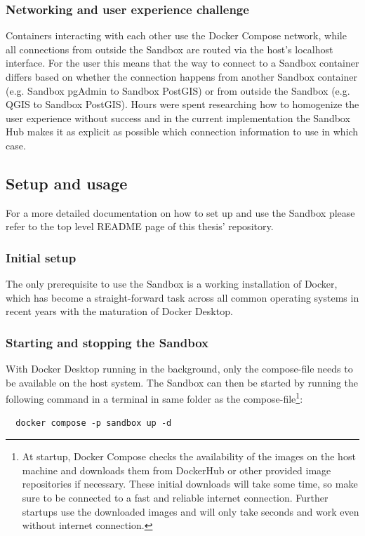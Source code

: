 \documentclass[11pt, a4paper, oneside, parskip=full-]{scrartcl}
\begin{document}
\subsubsection*{Networking and user experience challenge}
Containers interacting with each other use the Docker Compose network, while all
connections from outside the Sandbox are routed via the host's localhost
interface. For the user this means that the way to connect to a Sandbox
container differs based on whether the connection happens from another Sandbox
container (e.g. Sandbox pgAdmin to Sandbox PostGIS) or from outside the Sandbox
(e.g. QGIS to Sandbox PostGIS). Hours were spent researching how to homogenize
the user experience without success and in the current implementation the
Sandbox Hub makes it as explicit as possible which connection information to use
in which case.


\subsection{Setup and usage}
For a more detailed documentation on how to set up and use the Sandbox please
refer to the top level README page of this thesis'
repository\cite{osgissandbox}.

\subsubsection*{Initial setup}
The only prerequisite to use the Sandbox is a working installation of Docker,
which has become a straight-forward task across all common operating systems in
recent years with the maturation of Docker Desktop\cite{dockerdesktop}.

\subsubsection*{Starting and stopping the Sandbox}
With Docker Desktop running in the background, only the
compose-file\cite{sandboxcomposefile} needs to be available on the host system.
The Sandbox can then be started by running the following command in a terminal
in same folder as the compose-file\footnote{At startup, Docker Compose checks
the availability of the images on the host machine and downloads them from
DockerHub or other provided image repositories if necessary. These initial
downloads will take some time, so make sure to be connected to a fast and
reliable internet connection. Further startups use the downloaded images and
will only take seconds and work even without internet connection.}:
\begin{lstlisting}
  docker compose -p sandbox up -d
\end{lstlisting}
\end{document}
